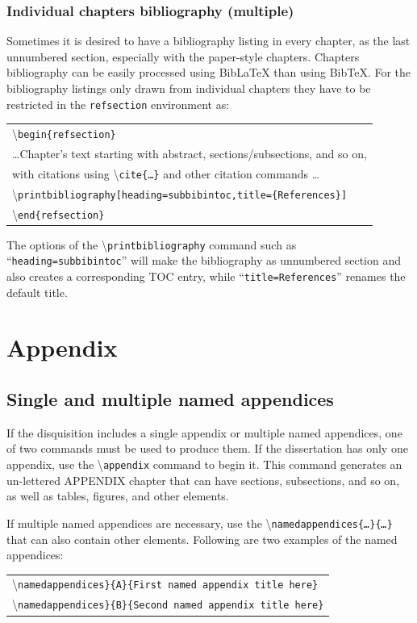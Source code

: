 \documentclass{article}
\newcommand\cmd[1]{\textbackslash\texttt{#1}}
\newcommand\ix[1]{#1\index{#1}} %
\newcommand\ccmd[1]{ %
\begin{center}
\begin{tabular}{l}
#1
\end{tabular}
\end{center}
}
\begin{document}
\subsubsection{Individual chapters bibliography (multiple)}
Sometimes it is desired to have a bibliography listing in every chapter, as the last unnumbered section, especially with the paper-style chapters. Chapters bibliography can be easily processed using Bib\LaTeX\/ than using \ix{BibTeX}. For the bibliography listings only drawn from individual chapters they have to be restricted in the \texttt{refsection} environment as:
\ccmd{
\cmd{begin\{\ix{refsection}\}}\\[1ex]
\hspace{0.2in}\ldots Chapter's text starting with abstract, sections/subsections, and so on, \\
\hspace{0.2in}with citations using \cmd{cite\{\ldots\}} and other citation commands \ldots \\[1ex]
\cmd{printbibliography[heading=subbibintoc,title=\{References\}]}\\
\cmd{end\{refsection\}}
}

The options of the \cmd{printbibliography} command such as ``\texttt{heading=subbibintoc}'' will make the bibliography as unnumbered section and also creates a corresponding TOC entry, while ``\texttt{title=References}'' renames the default title. 

\section{Appendix}

\subsection{Single and multiple named appendices}
If the disquisition includes a single \ix{appendix} or multiple named appendices, one of two commands must be used to produce them. If the dissertation has only one appendix, use the \cmd{appendix} command to begin it. This command generates an un-lettered APPENDIX chapter that can have sections, subsections, and so on, as well as tables, figures, and other elements.

If multiple named appendices are necessary, use the \cmd{\ix{namedappendices}\{\emph{\ldots}\}\{\emph{\ldots}\}} that can also contain other elements. Following are two examples of the named appendices:
\ccmd{
\cmd{namedappendices\}\{A\}\{First named appendix title here\}}\\
\cmd{namedappendices\}\{B\}\{Second named appendix title here\}}
}
\end{document}
